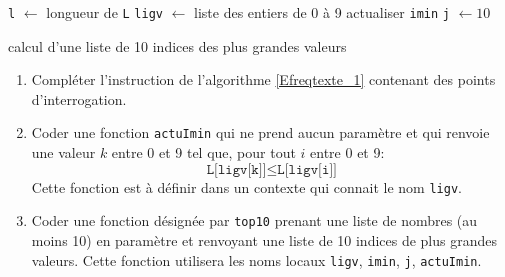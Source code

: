 \begin{enumerate}
\begin{algorithm}
  \texttt{l} $\leftarrow$ longueur de \texttt{L}\;
  \texttt{ligv} $\leftarrow$ liste des entiers de 0 à 9\;
  actualiser  \texttt{imin}\;
  \texttt{j} $\leftarrow 10$\;
  \caption{calcul d'une liste de 10 indices des plus grandes valeurs}
  \label{Efreqtexte_1}
\end{algorithm}
\begin{enumerate}
  \item Compléter l'instruction de l'algorithme \ref{Efreqtexte_1} contenant des points d'interrogation.
  \item Coder une fonction \texttt{actuImin} qui ne prend aucun paramètre et qui renvoie une valeur  $k$ entre 0 et 9 tel que, pour tout $i$ entre 0 et 9:
\begin{displaymath}
  \texttt{L[ligv[k]]} \leq \texttt{L[ligv[i]]} 
\end{displaymath}
Cette fonction est à définir dans un contexte qui connait le nom \texttt{ligv}.
  \item Coder une fonction désignée par \texttt{top10} prenant une liste de nombres (au moins 10) en paramètre et renvoyant une liste de 10 indices de plus grandes valeurs. Cette fonction utilisera les noms locaux \texttt{ligv}, \texttt{imin}, \texttt{j}, \texttt{actuImin}.
\end{enumerate}
\end{enumerate}

